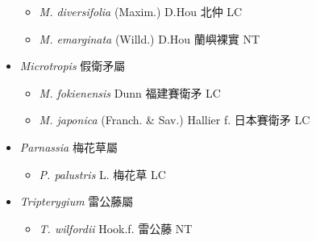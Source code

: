\begin{itemize}
  \begin{itemize}
        \item[] \textit{M. diversifolia} (Maxim.) D.Hou  北仲   LC
        \item[] \textit{M. emarginata} (Willd.) D.Hou  蘭嶼裸實   NT
  \end{itemize}
 \item[] \textit{Microtropis} 假衛矛屬
                                
  \begin{itemize}
        \item[] \textit{M. fokienensis} Dunn  福建賽衛矛   LC
        \item[] \textit{M. japonica} (Franch. \& Sav.) Hallier f.  日本賽衛矛   LC
  \end{itemize}
 \item[] \textit{Parnassia} 梅花草屬
                                
  \begin{itemize}
        \item[] \textit{P. palustris} L.  梅花草   LC
  \end{itemize}
 \item[] \textit{Tripterygium} 雷公藤屬
                                
  \begin{itemize}
        \item[] \textit{T. wilfordii} Hook.f.  雷公藤   NT
  \end{itemize}
  \end{itemize}
